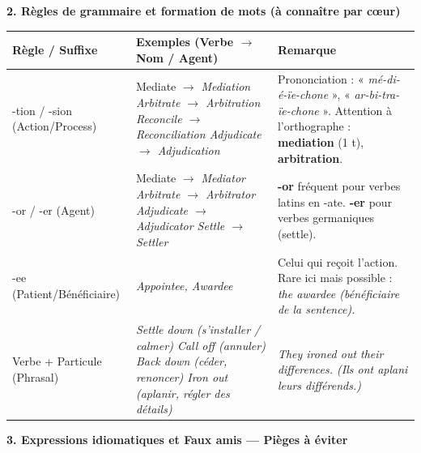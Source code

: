 \documentclass[11pt]{article}
\newcommand{\cle}[1]{{\popxbold\color{popdark}#1}}
\newcommand{\eng}[1]{\ifmmode\text{\textit{#1}}\else\begingroup\selectlanguage{english}\itshape #1\endgroup\fi}
\begin{document}
\begin{bilan}
\textbf{2. Règles de grammaire et formation de mots (à connaître par cœur)}

\begin{center}
\begin{tabularx}{\linewidth}{|X|X|X|}
\hline
\rowcolor{popblueL}
\textbf{Règle / Suffixe} & \textbf{Exemples (Verbe $\to$ Nom / Agent)} & \textbf{Remarque} \\
\hline
\cle{-tion / -sion} (Action/Process) & Mediate $\to$ \eng{Mediation} \newline Arbitrate $\to$ \eng{Arbitration} \newline Reconcile $\to$ \eng{Reconciliation} \newline Adjudicate $\to$ \eng{Adjudication} & Prononciation : « \emph{mé-di-é-ïe-chone} », « \emph{ar-bi-tra-ïe-chone} ». Attention à l'orthographe : \textbf{mediation} (1 t), \textbf{arbitration}. \\
\cle{-or / -er} (Agent) & Mediate $\to$ \eng{Mediator} \newline Arbitrate $\to$ \eng{Arbitrator} \newline Adjudicate $\to$ \eng{Adjudicator} \newline Settle $\to$ \eng{Settler} & \textbf{-or} fréquent pour verbes latins en -ate. \textbf{-er} pour verbes germaniques (settle). \\
\cle{-ee} (Patient/Bénéficiaire) & \eng{Appointee}, \eng{Awardee} & Celui qui reçoit l'action. Rare ici mais possible : \eng{the awardee} (bénéficiaire de la sentence). \\
\cle{Verbe + Particule (Phrasal)} & \eng{Settle down} (s'installer / calmer) \newline \eng{Call off} (annuler) \newline \eng{Back down} (céder, renoncer) \newline \eng{Iron out} (aplanir, régler des détails) & \eng{They ironed out their differences.} (Ils ont aplani leurs différends.) \\
\hline
\end{tabularx}
\end{center}

\textbf{3. Expressions idiomatiques et Faux amis — Pièges à éviter}


\end{bilan}
\end{document}
